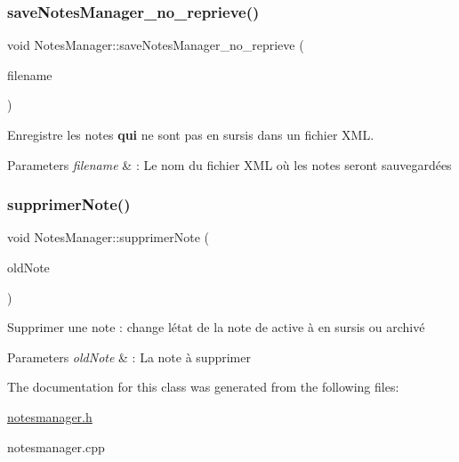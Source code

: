 \subsubsection{\texorpdfstring{save\+Notes\+Manager\+\_\+no\+\_\+reprieve()}{saveNotesManager\_no\_reprieve()}}
{\footnotesize\ttfamily void Notes\+Manager\+::save\+Notes\+Manager\+\_\+no\+\_\+reprieve (\begin{DoxyParamCaption}\item[{const Q\+String \&}]{filename }\end{DoxyParamCaption})}



Enregistre les notes {\bfseries qui} ne sont pas en sursis dans un fichier X\+ML. 


\begin{DoxyParams}{Parameters}
{\em filename} & \+: Le nom du fichier X\+ML où les notes seront sauvegardées \\
\hline
\end{DoxyParams}
\mbox{\label{class_notes_manager_a9fbe6a700b35ca996ddefa97cb15f6fb}} 
\subsubsection{\texorpdfstring{supprimer\+Note()}{supprimerNote()}}
{\footnotesize\ttfamily void Notes\+Manager\+::supprimer\+Note (\begin{DoxyParamCaption}\item[{\hyperlink{class_note}{Note} $\ast$}]{old\+Note }\end{DoxyParamCaption})}



Supprimer une note \+: change l\textquotesingle{}état de la note de active à en sursis ou archivé 


\begin{DoxyParams}{Parameters}
{\em old\+Note} & \+: La note à supprimer \\
\hline
\end{DoxyParams}


The documentation for this class was generated from the following files\+:\begin{DoxyCompactItemize}
\item 
\hyperlink{notesmanager_8h}{notesmanager.\+h}\item 
notesmanager.\+cpp\end{DoxyCompactItemize}
